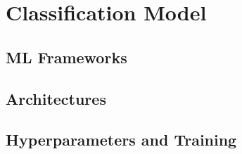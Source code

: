 \section{Classification Model}
\subsection{ML Frameworks}
\subsection{Architectures}
\subsection{Hyperparameters and Training}